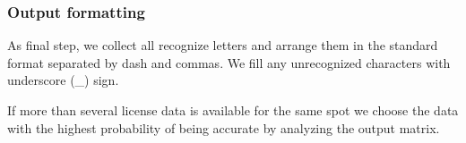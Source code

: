 \documentclass{standalone}
\begin{document}
\subsubsection{Output formatting}
    As final step, we collect all recognize letters and arrange them in the standard format separated by dash and commas. We fill any unrecognized characters with underscore (\_) sign.
    
    If more than several license data is available for the same spot we choose the data with the highest probability of being accurate by analyzing the output matrix.
\end{document}
